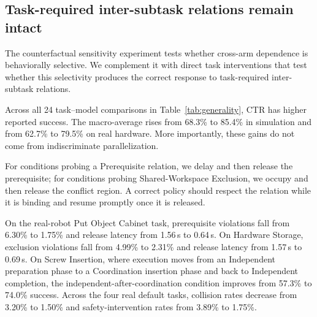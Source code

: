 \documentclass{article}
\newcommand{\method}{CTR}
\begin{document}

\subsection{Task-required inter-subtask relations remain intact}
The counterfactual sensitivity experiment tests whether cross-arm dependence is behaviorally selective. We complement it with direct task interventions that test whether this selectivity produces the correct response to task-required inter-subtask relations.

\begin{table}[t]
\caption{Default-condition success (\%) on four simulated and four real tasks. Each pair compares original demonstrations with \method{} using the same policy family.}
\label{tab:generality}
\centering\small\setlength{\tabcolsep}{5pt}

\end{table}

Across all 24 task--model comparisons in Table~\ref{tab:generality}, \method{} has higher reported success. The macro-average rises from 68.3\% to 85.4\% in simulation and from 62.7\% to 79.5\% on real hardware. More importantly, these gains do not come from indiscriminate parallelization.

For conditions probing a Prerequisite relation, we delay and then release the prerequisite; for conditions probing Shared-Workspace Exclusion, we occupy and then release the conflict region. A correct policy should respect the relation while it is binding and resume promptly once it is released.

\begin{table}[t]
\caption{Relation-selective interventions, averaged over models within each task. Violation is DVR for Prerequisite/Coordination conditions and XR for Shared-Workspace Exclusion conditions. Release measures latency after the binding prerequisite, coordination condition, or workspace exclusion is released.}
\label{tab:constraints}
\centering\small\setlength{\tabcolsep}{5pt}

\end{table}

On the real-robot Put Object Cabinet task, prerequisite violations fall from 6.30\% to 1.75\% and release latency from 1.56\,s to 0.64\,s. On Hardware Storage, exclusion violations fall from 4.99\% to 2.31\% and release latency from 1.57\,s to 0.69\,s. On Screw Insertion, where execution moves from an Independent preparation phase to a Coordination insertion phase and back to Independent completion, the independent-after-coordination condition improves from 57.3\% to 74.0\% success. Across the four real default tasks, collision rates decrease from 3.20\% to 1.50\% and safety-intervention rates from 3.89\% to 1.75\%.
\end{document}
